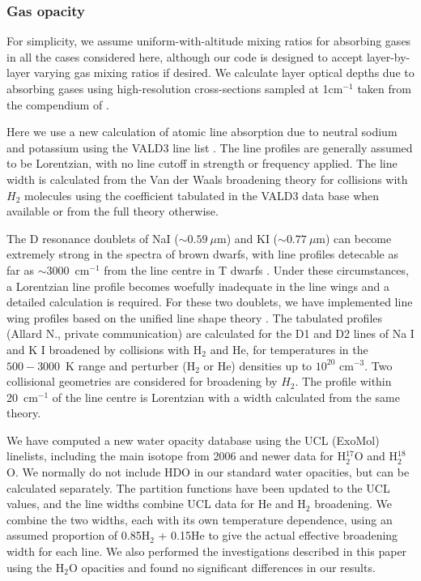 \documentclass[useAMS,usenatbib]{mn2e}
\begin{document}
\subsubsection{Gas opacity}

For simplicity, we assume uniform-with-altitude mixing ratios for absorbing gases in all the cases considered here, although our code is designed to accept layer-by-layer varying gas mixing ratios if desired. 
We calculate layer optical depths due to absorbing gases using high-resolution cross-sections sampled at 1cm$^{-1}$ \citep[as justified by ][ for Spex data]{line2016} taken from the compendium of \citet{freedman2008,freedman2014}. 


Here we use a new calculation of atomic line absorption due to neutral sodium and potassium using the VALD3 line list \citep[][\footnote{\url{http://vald.astro.univie.ac.at/~vald3/php/vald.php}}]{ryabchikova2015}. The line profiles are generally assumed to be Lorentzian, with no line cutoff in strength or frequency applied. The line width is calculated from the Van der Waals broadening theory for collisions with $H_{2}$ molecules using the coefficient tabulated in the VALD3 data base when available or from the full theory otherwise.

The D resonance doublets of NaI ($\sim 0.59~\mu$m) and KI ($\sim 0.77~\mu$m) can become extremely strong in the spectra of brown dwarfs, with line profiles detecable as far as $\sim$3000~cm$^{-1}$ from the line centre in T dwarfs \citep[e.g. ][]{burrows2000,liebert2000,marley2002,king2010}. Under these circumstances, a Lorentzian line profile becomes woefully inadequate in the line wings and a detailed calculation is required. For these two doublets, we have implemented line wing profiles based on the unified line shape theory \citep{nallard2007a,nallard2007b}. The tabulated profiles (Allard N., private communication) are calculated for the D1 and D2 lines of Na I and K I broadened by collisions with H$_{2}$ and He, for temperatures in the $500 - 3000$~K range and perturber (H$_{2}$ or He) densities up to $10^{20}$ cm$^{-3}$. Two collisional geometries are considered for broadening by $H_{2}$. The profile within 20~cm$^{-1}$ of the line centre is Lorentzian with a width calculated from the same theory. 

We have computed a new water opacity database using the UCL (ExoMol) linelists, including the main isotope from 2006 and newer data for H$_{2}^{17}$O and H$_{2}^{18}$O. We normally do not include HDO in our standard water opacities, but can be calculated separately. The partition functions have been updated to the UCL values, and the line widths combine UCL data for He and H$_2$ broadening. We combine the two widths, each with its own temperature dependence, using an assumed proportion of 0.85H$_{2}$ + 0.15He to give the actual effective broadening width for each line.  We also performed the investigations described in this paper using the \citet{partridge1997} H$_{2}$O opacities and found no significant differences in our results.   
\end{document}
